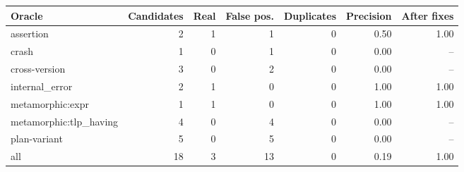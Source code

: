 \begin{tabular}{lrrrrrr}
\toprule
Oracle & Candidates & Real & False pos. & Duplicates & Precision & After fixes \\
\midrule
assertion & 2 & 1 & 1 & 0 & 0.50 & 1.00 \\
crash & 1 & 0 & 1 & 0 & 0.00 & -- \\
cross-version & 3 & 0 & 2 & 0 & 0.00 & -- \\
internal\_error & 2 & 1 & 0 & 0 & 1.00 & 1.00 \\
metamorphic:expr & 1 & 1 & 0 & 0 & 1.00 & 1.00 \\
metamorphic:tlp\_having & 4 & 0 & 4 & 0 & 0.00 & -- \\
plan-variant & 5 & 0 & 5 & 0 & 0.00 & -- \\
\midrule
all & 18 & 3 & 13 & 0 & 0.19 & 1.00 \\
\bottomrule
\end{tabular}
